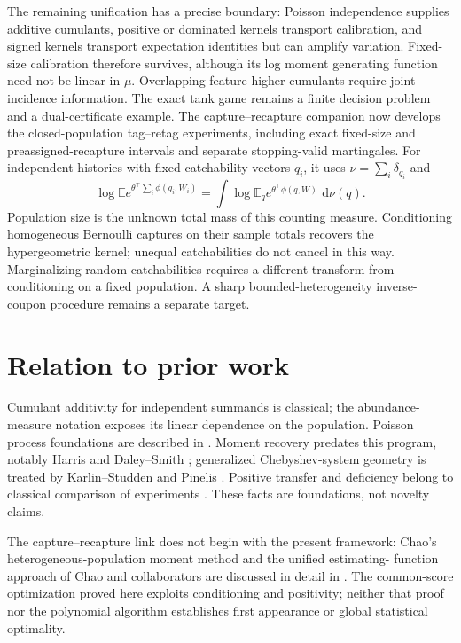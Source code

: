 \documentclass[11pt]{article}
\theoremstyle{remark}\newtheorem{remark}[theorem]{Remark}
\newcommand{\E}{\mathbb E}\newcommand{\PP}{\mathbb P}
\newcommand{\dd}{\,\mathrm d}\newcommand{\ind}{\mathbf1}
\begin{document}
The remaining unification has a precise boundary: Poisson independence
supplies additive cumulants, positive or dominated kernels transport
calibration, and signed kernels transport expectation identities but can
amplify variation. Fixed-size calibration therefore survives, although its
log moment generating function need not be linear in $\mu$.
Overlapping-feature higher cumulants require joint incidence information.
The exact tank game remains a finite decision problem and a dual-certificate
example. The capture--recapture companion \cite{LongCapture} now develops the
closed-population tag--retag experiments, including exact fixed-size and
preassigned-recapture intervals and separate stopping-valid martingales.
For independent histories with fixed catchability vectors $q_i$, it uses
$\nu=\sum_i\delta_{q_i}$ and
\[
 \log\E e^{\theta^\top\sum_i\phi(q_i,W_i)}
 =\int\log\E_q e^{\theta^\top\phi(q,W)}\,\dd\nu(q).
\]
Population size is the unknown total mass of this counting measure.
Conditioning homogeneous Bernoulli captures on their sample totals recovers
the hypergeometric kernel; unequal catchabilities do not cancel in this way.
Marginalizing random catchabilities requires a different transform from
conditioning on a fixed population. A sharp bounded-heterogeneity
inverse-coupon procedure remains a separate target.

\section{Relation to prior work}\label{sec:prior}
Cumulant additivity for independent summands is classical; the abundance-measure
notation exposes its linear dependence on the population.
Poisson process foundations are described in \cite{LastPenrose}.
Moment recovery predates this program, notably Harris \cite{Harris} and
Daley--Smith \cite{DaleySmith}; generalized Chebyshev-system geometry is treated
by Karlin--Studden and Pinelis \cite{KarlinStudden,Pinelis}.
Positive transfer and deficiency belong to classical comparison of experiments
\cite{Blackwell,Torgersen}. These facts are foundations, not novelty claims.

The capture--recapture link does not begin with the present framework:
Chao's heterogeneous-population moment method and the unified estimating-
function approach of Chao and collaborators are discussed in detail in
\cite{LongCapture}. The common-score optimization proved here exploits
conditioning and positivity; neither that proof nor the polynomial algorithm
establishes first appearance or global statistical optimality.
\end{document}
